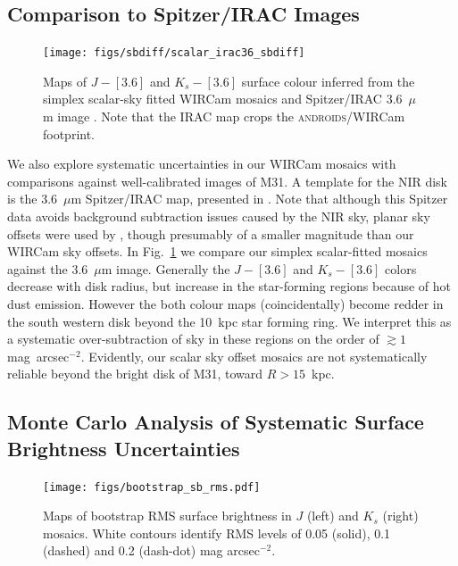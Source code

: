 \documentclass[iop]{emulateapj}
\newcommand{\androids}{\textsc{androids}}
\newcommand{\Fig}[1]{Fig.~\ref{fig:#1}}  %
\begin{document}
\subsection{Comparison to Spitzer/IRAC Images}

\begin{figure}[t]
\centering
\texttt{[image: figs/sbdiff/scalar\_irac36\_sbdiff]}
\caption{Maps of $J-[3.6]$ and $K_s-[3.6]$ surface colour inferred from the simplex scalar-sky fitted WIRCam mosaics and Spitzer/IRAC 3.6~$\mu$m image \citep{Barmby:2006}.
Note that the IRAC map crops the \androids/WIRCam footprint.}
\label{fig:scalar_irac36_sbdiff}
\end{figure}

We also explore systematic uncertainties in our WIRCam mosaics with comparisons against well-calibrated images of M31.
A template for the NIR disk is the 3.6~$\mu$m Spitzer/IRAC map, presented in \cite{Barmby:2006}.
Note that although this Spitzer data avoids background subtraction issues caused by the NIR sky, planar sky offsets were used by \citeauthor{Barmby:2006}, though presumably of a smaller magnitude than our WIRCam sky offsets.
In \Fig{scalar_irac36_sbdiff} we compare our simplex scalar-fitted mosaics against the 3.6~$\mu$m image.
Generally the $J-[3.6]$ and $K_s-[3.6]$ colors decrease with disk radius, but increase in the star-forming regions because of hot dust emission.
However the both colour maps (coincidentally) become redder in the south western disk beyond the 10~kpc star forming ring.
We interpret this as a systematic over-subtraction of sky in these regions on the order of $\gtrsim 1$ mag~arcsec$^{-2}$.
Evidently, our scalar sky offset mosaics are not systematically reliable beyond the bright disk of M31, toward $R>15$~kpc.

\subsection{Monte Carlo Analysis of Systematic Surface Brightness Uncertainties}
\label{sec:montecarlo}

\begin{figure}[t]
\centering
\texttt{[image: figs/bootstrap\_sb\_rms.pdf]}
\caption{Maps of bootstrap RMS surface brightness in $J$ (left) and $K_s$ (right) mosaics.
White contours identify RMS levels of 0.05 (solid), 0.1 (dashed) and 0.2 (dash-dot) mag arcsec$^{-2}$.}
\label{fig:bootstrap_sb_rms}
\end{figure}
\end{document}
